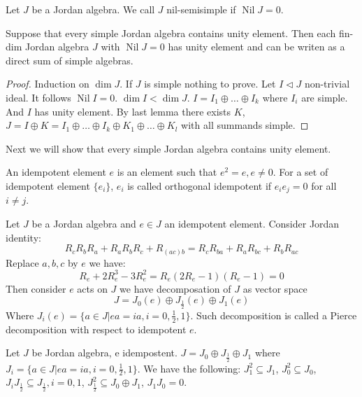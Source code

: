 \documentclass{article}
\begin{document}
\begin{definition} 
Let $ J $ be a Jordan algebra. We call $ J $ nil-semisimple if $ \operatorname{Nil}J=0 $.   
\end{definition}

\begin{theorem} 
Suppose that every simple Jordan algebra contains unity element. Then each fin-dim Jordan algebra $ J $ with $ \operatorname{Nil}J=0 $ has unity element and can be writen as a direct sum of simple algebras.   
\end{theorem}

\begin{proof} 
Induction on $ \operatorname{dim}J $. If $ J $ is simple nothing to prove. Let $ I \triangleleft J $ non-trivial ideal. It follows $ \operatorname{Nil}I=0 $. $ \operatorname{dim}I < \operatorname{dim}J $. $ I=I_1 \oplus \ldots \oplus I_k $ where $ I_i $ are simple. And $ I $ has unity element. By last lemma there exists $ K $, $ J=I\oplus K=I_1 \oplus \ldots \oplus I_k \oplus K_1 \oplus \ldots \oplus K_l $ with all summands simple.   
\end{proof}

Next we will show that every simple Jordan algebra contains unity element.

\begin{definition} 
An idempotent element $ e $ is an element such that $ e^2=e, e \neq 0 $. For a set of idempotent element $ \{e_i\} $, $ e_i $ is called orthogonal idempotent if $ e_ie_j=0 $ for all $ i \neq j $.
\end{definition}

\begin{definition} 
Let $ J $ be a Jordan algebra and $ e \in J $ an idempotent element. Consider Jordan identity:
\[
R_cR_bR_a+R_aR_bR_c+R_{(ac)b}=R_cR_{ba}+R_aR_{bc}+R_bR_{ac}
\]    
Replace $ a,b,c $ by $ e $ we have:
\[
R_e+2R_e^3-3R_e^2=R_e(2R_e-1)(R_e-1)=0
\]  
Then consider $ e $ acts on $ J $ we have decomposation of $ J $ as vector space
 \[ J=J_0(e) \oplus J_{\frac{1}{2}}(e) \oplus J_1(e) \] 
 Where $ J_i(e)=\{ a \in J | ea=ia , i=0,\frac{1}{2}, 1\} $. Such decomposition is called a Pierce decomposition with respect to idempotent $ e $.
\end{definition}

\begin{theorem} 
Let $ J $ be Jordan algebra, e idempostent. $ J=J_0 \oplus J_{\frac{1}{2}} \oplus J_1 $ where $ J_i=\{ a \in J | ea=ia , i=0,\frac{1}{2}, 1\} $. We have the following: $ J_1^2 \subseteq J_1 $, $ J_0^2 \subseteq J_0 $, $ J_i J_{\frac{1}{2}} \subseteq J_{\frac{1}{2}},i=0,1 $, $ J_{\frac{1}{2}}^2 \subseteq J_0\oplus J_1 $, $ J_1J_0=0 $.      
\end{theorem}
\end{document}
